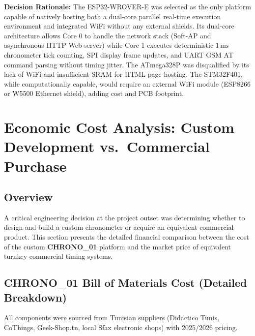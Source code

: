 \documentclass[12pt,a4paper,oneside]{report}
\begin{document}
\noindent\textbf{Decision Rationale:} The ESP32-WROVER-E was selected as the only platform capable of natively hosting both a dual-core parallel real-time execution environment and integrated WiFi without any external shields. Its dual-core architecture allows Core 0 to handle the network stack (Soft-AP and asynchronous HTTP Web server) while Core 1 executes deterministic $1\,\text{ms}$ chronometer tick counting, SPI display frame updates, and UART GSM AT command parsing without timing jitter. The ATmega328P was disqualified by its lack of WiFi and insufficient SRAM for HTML page hosting. The STM32F401, while computationally capable, would require an external WiFi module (ESP8266 or W5500 Ethernet shield), adding cost and PCB footprint.

\section{Economic Cost Analysis: Custom Development vs.~Commercial Purchase}

\subsection{Overview}
A critical engineering decision at the project outset was determining whether to design and build a custom chronometer or acquire an equivalent commercial product. This section presents the detailed financial comparison between the cost of the custom \textbf{CHRONO\_01} platform and the market price of equivalent turnkey commercial timing systems.

\subsection{CHRONO\_01 Bill of Materials Cost (Detailed Breakdown)}
All components were sourced from Tunisian suppliers (Didactico Tunis, CoThings, Geek-Shop.tn, local Sfax electronic shops) with 2025/2026 pricing.
\end{document}
